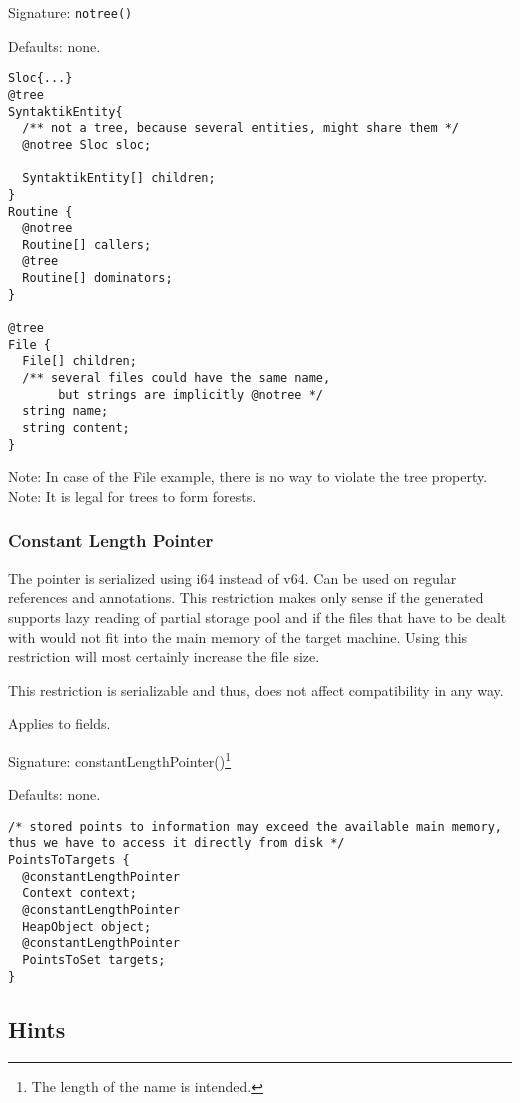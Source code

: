 Signature: \verb/notree()/

Defaults: none.

\begin{lstlisting}[label=treeExample,caption=Examples,language=skill]
Sloc{...}
@tree
SyntaktikEntity{
  /** not a tree, because several entities, might share them */
  @notree Sloc sloc;
  
  SyntaktikEntity[] children;
}
Routine {
  @notree
  Routine[] callers;
  @tree
  Routine[] dominators;
}

@tree
File {
  File[] children;
  /** several files could have the same name,
       but strings are implicitly @notree */
  string name;
  string content;
} 
\end{lstlisting}
Note: In case of the File example, there is no way to violate the tree property.
Note: It is legal for trees to form forests.


\subsubsection*{Constant Length Pointer}
The pointer is serialized using i64 instead of v64. Can be used on regular references and annotations. This restriction makes only sense if the generated supports lazy reading of partial storage pool and if the files that have to be dealt with would not fit into the main memory of the target machine. Using this restriction will most certainly increase the file size.

This restriction is serializable and thus, does not affect compatibility in any way.

Applies to fields.

Signature: constantLengthPointer()\footnote{The length of the name is intended.}

Defaults: none.

\begin{lstlisting}[label=constantLengthPointerExample,caption=Examples,language=skill]
/* stored points to information may exceed the available main memory, thus we have to access it directly from disk */
PointsToTargets {
  @constantLengthPointer
  Context context;
  @constantLengthPointer
  HeapObject object;
  @constantLengthPointer
  PointsToSet targets;
}
\end{lstlisting}

\subsection{Hints}
\label{hints}

